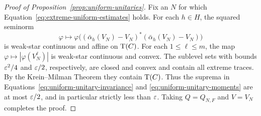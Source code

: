 \begin{proof}[Proof of Proposition~\ref{prop:uniform-unitaries}]
Fix an \(N\) for which Equation~\eqref{eq:extreme-uniform-estimates}
holds. For each \(h\in H\), the squared seminorm
\[
 \varphi\longmapsto
 \varphi\bigl((\bar\alpha_h(V_N)-V_N)^*
              (\bar\alpha_h(V_N)-V_N)\bigr)
\]
is weak-star continuous and affine on \(\operatorname{T}(C)\). For each
\(1\leq\ell\leq m\), the map
\(\varphi\mapsto|\varphi(V_N^\ell)|\) is weak-star continuous
and convex. The sublevel sets with bounds \(\varepsilon^2/4\) and
\(\varepsilon/2\), respectively, are closed and convex and contain
all extreme traces. By the Krein--Milman Theorem they contain
\(\operatorname{T}(C)\). Thus the suprema in
Equations~\eqref{eq:uniform-unitary-invariance} and
\eqref{eq:uniform-unitary-moments} are at most \(\varepsilon/2\),
and in particular strictly less than \(\varepsilon\).
Taking \(Q=Q_{N,F}\) and \(V=V_N\) completes the proof.
\end{proof}
